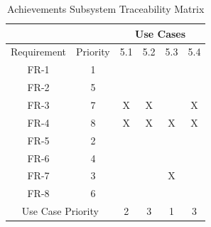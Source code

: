 \documentclass{article}
\begin{document}
\begin{enumerate}
	\begin{table}[]
 \centering
 \caption{Achievements Subsystem Traceability Matrix}
 \label{my-label}
 \begin{tabular}{cc|c|c|c|c|}
 \cline{3-6}
                                   &          & \multicolumn{4}{c|}{Use Cases} \\ \hline
 \multicolumn{1}{|c|}{Requirement} & Priority & 5.1    & 5.2   & 5.3   & 5.4   \\ \hline
 \multicolumn{1}{|c|}{FR-1}        & 1        &        &       &       &       \\ \hline
 \multicolumn{1}{|c|}{FR-2}        & 5        &        &       &       &       \\ \hline
 \multicolumn{1}{|c|}{FR-3}        & 7        & X      & X     &       & X     \\ \hline
 \multicolumn{1}{|c|}{FR-4}        & 8        & X      & X     & X     & X     \\ \hline
 \multicolumn{1}{|c|}{FR-5}        & 2        &        &       &       &       \\ \hline
 \multicolumn{1}{|c|}{FR-6}        & 4        &        &       &       &       \\ \hline
 \multicolumn{1}{|c|}{FR-7}        & 3        &        &       & X     &       \\ \hline
 \multicolumn{1}{|c|}{FR-8}        & 6        &        &       &       &       \\ \hline
 \multicolumn{2}{|c|}{Use Case Priority}      & 2      & 3     & 1     & 3     \\ \hline
 \end{tabular}
 \end{table}
	

\end{enumerate}
\end{document}
